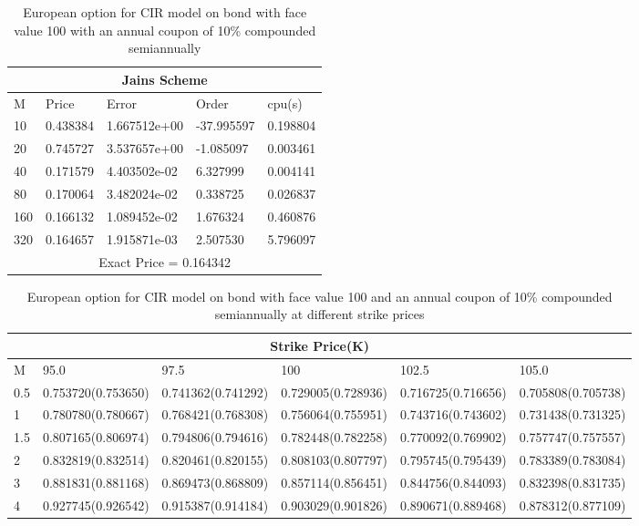 \documentclass[11pt]{article}
\begin{document}
\begin{table}[htp]
\begin{tabular}{ |p{2cm}|p{3cm}|p{3cm}|p{3cm}|p{3cm}|  }
 \hline
 \multicolumn{5}{|c|}{Jains Scheme} \\
 \hline
 M & Price & Error & Order & cpu(s)\\
 \hline
10 & 0.438384 & 1.667512e+00 & -37.995597 & 0.198804\\
20 & 0.745727 & 3.537657e+00 & -1.085097 & 0.003461\\
40 & 0.171579 & 4.403502e-02 & 6.327999 & 0.004141\\
80 & 0.170064 & 3.482024e-02 & 0.338725 & 0.026837\\
160 & 0.166132 & 1.089452e-02 & 1.676324 & 0.460876\\
320 & 0.164657 & 1.915871e-03 & 2.507530 & 5.796097\\
 \hline
 \multicolumn{5}{|c|}{Exact Price = 0.164342} \\
 \hline
 
\end{tabular}
\caption{ European option for CIR model on bond with face value 100 with an annual coupon of 10\% compounded semiannually}

\end{table}


\begin{table}[htp]
\begin{tabular}{ |p{0.8cm}|p{3cm}|p{3cm}|p{3cm}|p{3cm}|p{3cm}|  }
 \hline 
 \multicolumn{6}{|c|}{Strike Price(K)} \\
 \hline
 M &  95.0 & 97.5 & 100 & 102.5 & 105.0\\
 \hline
0.5 & 0.753720(0.753650) & 0.741362(0.741292) & 0.729005(0.728936) & 0.716725(0.716656) & 0.705808(0.705738)\\
1 & 0.780780(0.780667) & 0.768421(0.768308) & 0.756064(0.755951) & 0.743716(0.743602) & 0.731438(0.731325)\\
1.5 & 0.807165(0.806974) & 0.794806(0.794616) & 0.782448(0.782258) & 0.770092(0.769902) & 0.757747(0.757557)\\
2 & 0.832819(0.832514) & 0.820461(0.820155) & 0.808103(0.807797) & 0.795745(0.795439) & 0.783389(0.783084)\\
3 & 0.881831(0.881168) & 0.869473(0.868809) & 0.857114(0.856451) & 0.844756(0.844093) & 0.832398(0.831735)\\
4 & 0.927745(0.926542) & 0.915387(0.914184) & 0.903029(0.901826) & 0.890671(0.889468) & 0.878312(0.877109)\\

 \hline
 
 
\end{tabular}
\caption{ European option for CIR model on bond with face value 100 and an annual coupon of 10\% compounded semiannually at different strike prices}


\end{table}
\end{document}
